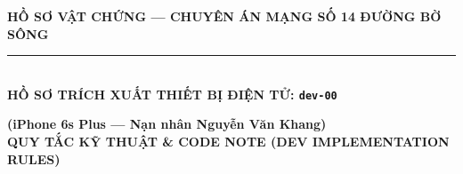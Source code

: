 \documentclass[12pt,a4paper]{article}
\begin{document}
\begin{center}
    \fontsize{11pt}{13pt}\selectfont
    \textbf{HỒ SƠ VẬT CHỨNG — CHUYÊN ÁN MẠNG SỐ 14 ĐƯỜNG BỜ SÔNG}\\[-0.2em]
    \rule{6cm}{0.6pt}\\[0.5cm]
    \textbf{\Large  HỒ SƠ TRÍCH XUẤT THIẾT BỊ ĐIỆN TỬ: \texttt{dev-00}}\\[0.15cm]
    \textit{}
\end{center}
\vspace{0.3cm}

\vspace{0.3cm}\noindent\textbf{\large (iPhone 6s Plus — Nạn nhân Nguyễn Văn Khang)}\\[0.15cm]




\vspace{0.35cm}\noindent\textbf{\large  QUY TẮC KỸ THUẬT \& CODE NOTE (DEV IMPLEMENTATION RULES)}\\[0.15cm]
\end{document}
